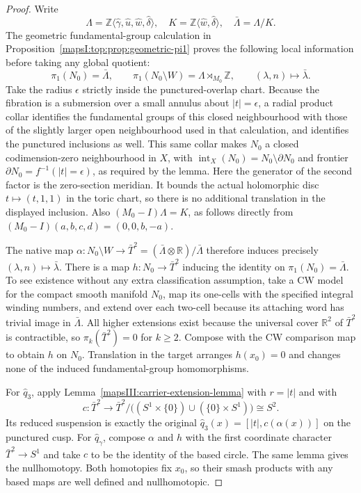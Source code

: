 \begin{proof}
Write
\[
 \Lambda=\mathbb Z\langle\widehat\gamma,\widehat u,
                    \widehat w,\widehat\delta\rangle,
 \quad
 K=\mathbb Z\langle\widehat w,\widehat\delta\rangle,
 \quad
 \bar\Lambda=\Lambda/K.
\]
The geometric fundamental-group calculation in
Proposition~\ref{mapsI:top:prop:geometric-pi1} proves the following
local information before taking any global quotient:
\[
 \pi_1(N_0)=\bar\Lambda,\qquad
 \pi_1(N_0\setminus W)=\Lambda\rtimes_{M_0}\mathbb Z,
 \qquad
 (\lambda,n)\longmapsto\bar\lambda.
\]
Take the radius $\epsilon$ strictly inside the punctured-overlap chart.
Because the fibration is a submersion over a small annulus about
$|t|=\epsilon$, a radial product collar identifies the fundamental
groups of this closed neighbourhood with those of the slightly larger
open neighbourhood used in that calculation, and identifies the
punctured inclusions as well.  This same collar makes $N_0$ a closed
codimension-zero neighbourhood in $X$, with
$\operatorname{int}_X(N_0)=N_0\setminus\partial N_0$ and frontier
$\partial N_0=f^{-1}(|t|=\epsilon)$, as required by the lemma.
Here the generator of the second factor is the zero-section meridian.
It bounds the actual holomorphic disc
$t\mapsto(t,1,1)$ in the toric chart, so there is no additional
translation in the displayed inclusion. Also
$(M_0-I)\Lambda=K$, as follows directly from
$(M_0-I)(a,b,c,d)=(0,0,b,-a)$.

The native map
$\alpha:N_0\setminus W\to\bar T^2=
(\bar\Lambda\otimes\mathbb R)/\bar\Lambda$
therefore induces precisely $(\lambda,n)\mapsto\bar\lambda$.
There is a map $h:N_0\to\bar T^2$ inducing the identity on
$\pi_1(N_0)=\bar\Lambda$. To see existence without any extra
classification assumption, take a CW model for the compact smooth
manifold $N_0$, map its one-cells with the specified integral winding
numbers, and extend over each two-cell because its attaching word
has trivial image in $\bar\Lambda$. All higher extensions exist
because the universal cover $\mathbb R^2$ of $\bar T^2$ is
contractible, so $\pi_k(\bar T^2)=0$ for $k\geq2$.
Compose with the CW comparison map to obtain $h$ on $N_0$.
Translation in the target arranges $h(x_0)=0$ and changes none of
the induced fundamental-group homomorphisms.

For $\widehat q_3$, apply Lemma~\ref{mapsIII:carrier-extension-lemma}
with $r=|t|$ and with
\[
 c:\bar T^2\longrightarrow
 \bar T^2/\bigl((S^1\times\{0\})\cup(\{0\}\times S^1)\bigr)
 \cong S^2.
\]
Its reduced suspension is exactly the original
$\widehat q_3(x)=[|t|,c(\alpha(x))]$ on the punctured cusp.
For $\widehat q_\gamma$, compose $\alpha$ and $h$ with the first
coordinate character $\bar T^2\to S^1$ and take $c$ to be the
identity of the based circle. The same lemma gives the nullhomotopy.
Both homotopies fix $x_0$, so their smash products with any based maps
are well defined and nullhomotopic.
\end{proof}

